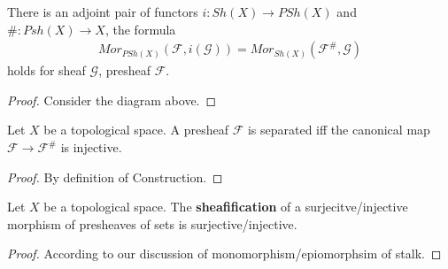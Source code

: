 \documentclass[Total.tex]{subfiles}
\begin{document}
				\begin{proposition}
					There is an adjoint pair of functors $i:Sh(X)\rightarrow PSh(X)$ and $\#:Psh(X)\rightarrow X$, the formula
					\begin{gather*}
						Mor_{PSh(X)}(\mathcal{F},i(\mathcal{G}))=Mor_{Sh(X)}(\mathcal{F}^\#,\mathcal{G})
					\end{gather*}
					holds for sheaf $\mathcal{G}$, presheaf $\mathcal{F}$.
				\end{proposition}
				\begin{proof}
					Consider the diagram above. 
				\end{proof}
				\begin{lemma}
					Let $X$ be a topological space. A presheaf $\mathcal{F}$ is separated iff the canonical map $\mathcal{F}\rightarrow \mathcal{F}^\#$ is injective.
				\end{lemma}
				\begin{proof}
					By definition of Construction.
				\end{proof}
				\begin{lemma}
					Let $X$ be a topological space. The \textbf{sheafification} of a surjecitve/injective morphism of presheaves of sets is surjective/injective.
				\end{lemma}
				\begin{proof}
					According to our discussion of monomorphism/epiomorphsim of stalk.
				\end{proof}
			
\end{document}
